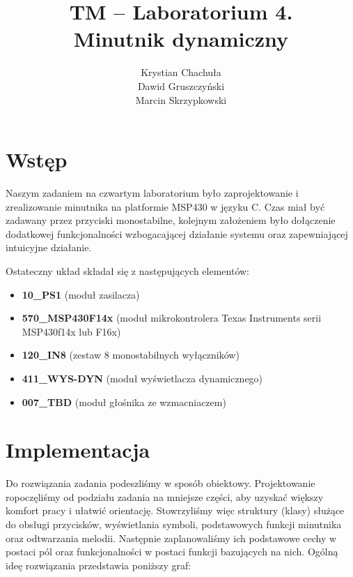 \documentclass[fleqn]{article}
\title{TM -- Laboratorium 4. \\ \large Minutnik dynamiczny}
\author{Krystian Chachuła \\ Dawid Gruszczyński \\ Marcin Skrzypkowski}
\begin{document}
\maketitle

\setcounter{page}{0}
\thispagestyle{empty}

\pagebreak

\setcounter{page}{1}

\section{Wstęp}

Naszym zadaniem na czwartym laboratorium było zaprojektowanie i zrealizowanie minutnika na platformie MSP430 w języku C. Czas miał być zadawany przez przyciski monostabilne, kolejnym założeniem było dołączenie dodatkowej funkcjonalności wzbogacającej działanie systemu oraz zapewniającej intuicyjne działanie.

Ostateczny układ składał się z następujących elementów:

\begin{itemize}
	\item \textbf{10\_PS1} (moduł zasilacza)
	\item \textbf{570\_MSP430F14x} (moduł mikrokontrolera Texas Instruments serii MSP430f14x lub F16x)
	\item \textbf{120\_IN8} (zestaw 8 monostabilnych wyłączników)
	\item \textbf{411\_WYS-DYN} (moduł wyświetlacza dynamicznego)
	\item \textbf{007\_TBD} (moduł głośnika ze wzmacniaczem)
\end{itemize}

\section{Implementacja}

Do rozwiązania zadania podeszliśmy w sposób obiektowy. Projektowanie ropoczęliśmy od podziału zadania na mniejsze części, aby uzyskać większy komfort pracy i ułatwić orientację. Stowrzyliśmy więc struktury (klasy) służące do obsługi przycisków, wyświetlania symboli, podstawowych funkcji minutnika oraz odtwarzania melodii. Następnie zaplanowaliśmy ich podstawowe cechy w postaci pól oraz funkcjonalności w postaci funkcji bazujących na nich. Ogólną ideę rozwiązania przedstawia poniższy graf: %
\end{document}
